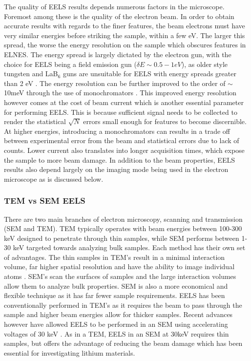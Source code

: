 The quality of EELS results depends numerous factors in the microscope.  Foremost among these is the quality of the electron beam.  In order to obtain accurate results with regards to the finer features, the beam electrons must have very similar energies before striking the sample, within a few eV.  The larger this spread, the worse the energy resolution on the sample which obscures features in ELNES.  The energy spread is largely dictated by the electron gun, with the choice for EELS being a field emission gun ($\delta E \sim 0.5-1eV$), as older style tungsten and LaB$_6$ guns are unsuitable for EELS with energy spreads greater than 2 eV \cite{reimer_transmission_2008}.  The energy resolution can be further improved to the order of $\sim$10meV through the use of monochromators \cite{hachtel_exploring_2018}.  This improved energy resolution however comes at the cost of beam current which is another essential parameter for performing EELS.  This is because sufficient signal needs to be collected to render the statistical $\sqrt{N}$ errors small enough for features to become discernible.  At higher energies, introducing a monochromators can results in a trade off between experimental error from the beam and statistical errors due to lack of counts.  Lower current also translates into longer acquisition times, which expose the sample to more beam damage.  In addition to the beam properties, EELS results also depend largely on the imaging mode being used in the electron microscope as is discussed below.


\subsubsection{TEM vs SEM EELS}
There are two main branches of electron microscopy, scanning and transmission (SEM and TEM).  TEM typically operates with beam energies between 100-300 keV designed to penetrate through thin samples, while SEM performs between 1-30 keV targeted towards analyzing bulk samples.  Each method has their own set of advantages.  The thin samples in TEM's result in a minimal interaction volume, far higher spatial resolution and have the ability to image individual atoms \cite{hansen_atomic-resolution_2001}. SEM's scan the surfaces of samples and the large interaction volumes allow them to analyze bulk properties.  SEM is also a more economical and flexible technique as it has far fewer sample requirements.   EELS has been conventionally performed in TEM's as it requires the beam to pass through the sample and higher beam energies allow for thicker samples. Recent advances however have allowed EELS to be performed in an SEM using accelerating voltages of 30 keV \cite{SU_9000}.  As in a TEM, EELS in an SEM at 30keV requires thin samples, but offers the advantage of reducing the beam damage which has been essential for investigating lithium materials. 



